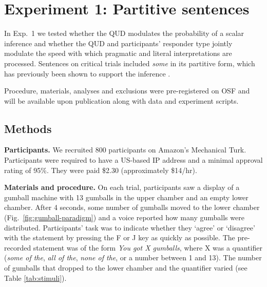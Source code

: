 \documentclass[10pt,letterpaper]{article}
\begin{document}
\section{Experiment 1: Partitive sentences}

In Exp.~1 we tested whether the QUD  modulates the probability of a scalar inference and whether the QUD and participants' responder type jointly modulate the speed with which pragmatic and literal interpretations are processed. Sentences on critical trials included \emph{some} in its partitive form, which has previously been shown to support the inference \cite{Degen2015}.

Procedure, materials, analyses and exclusions were pre-registered on OSF and will be available upon publication along with data and experiment scripts.

\subsection{Methods}

\noindent \textbf{Participants.} We recruited 800 participants on Amazon's Mechanical Turk. Participants were required to have a US-based IP address and a minimal approval rating of 95\%. They were paid \$2.30 (approximately \$14/hr). 

\noindent \textbf{Materials and procedure.} On each trial, participants saw a display of a gumball machine with 13 gumballs in the upper chamber and an empty lower chamber. After 4 seconds, some number of gumballs moved to the lower chamber (Fig.~\ref{fig:gumball-paradigm}) and a voice reported how many gumballs were distributed. Participants' task was to indicate whether they `agree' or `disagree' with the statement by pressing the F or J key as quickly as possible. The pre-recorded statement was of the form \emph{You got X gumballs}, where X was a quantifier (\textit{some of the},  \textit{all of the}, \textit{none of the}, or a number between 1 and 13). The number of gumballs that dropped to the lower chamber and the quantifier  varied (see Table \ref{tab:stimuli}).
\end{document}
